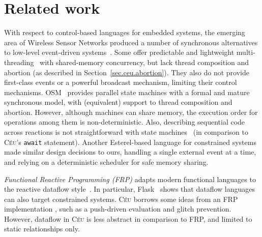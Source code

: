 \documentclass{acm_proc_article-sp}
\newcommand{\CEU}{\textsc{C\'{e}u}\xspace}
\newcommand{\code}[1] {{\small{\texttt{#1}}}}
\newcommand{\1}{\;}
\newcommand{\2}{\;\;}
\newcommand{\3}{\;\;\;}
\newcommand{\5}{\;\;\;\;\;}
\begin{document}
\section{Related work}
\label{sec.related}

With respect to control-based languages for embedded systems, the emerging area 
of Wireless Sensor Networks produced a number of synchronous alternatives to 
low-level event-driven 
systems~\cite{wsn.protothreads,wsn.sol,wsn.osm,wsn.tinythreads}.
%
Some offer predictable and lightweight
multi-threading~\cite{wsn.protothreads,wsn.tinythreads} with shared-memory 
concurrency, but lack thread composition and abortion (as described in 
Section~\ref{sec.ceu.abortion}).
They also do not provide first-class events or a powerful broadcast mechanism, 
limiting their control mechanisms.
%
OSM~\cite{wsn.osm} provides parallel state machines with a formal and mature 
synchronous model, with (equivalent) support to thread composition and 
abortion.
However, although machines can share memory, the execution order for operations 
among them is non-deterministic.
Also, describing sequential code across reactions is not straightforward with 
state machines~\cite{wsn.osm} (in comparison to \CEU's \code{await} statement).
%
Another Esterel-based language for constrained systems~\cite{wsn.sol} made 
similar design decisions to ours, handling a single external event at a time, 
and relying on a deterministic scheduler for safe memory sharing.

\emph{Functional Reactive Programming (FRP)} adapts modern functional languages 
to the reactive dataflow style~\cite{frp.principles}.
In particular, Flask~\cite{wsn.flask} shows that dataflow languages can also 
target constrained systems.
%
\CEU borrows some ideas from an FRP implementation \cite{frtime.embedding}, 
such as a push-driven evaluation and glitch prevention.
However, dataflow in \CEU is less abstract in comparison to FRP, and limited to 
static relationships only.

\end{document}

